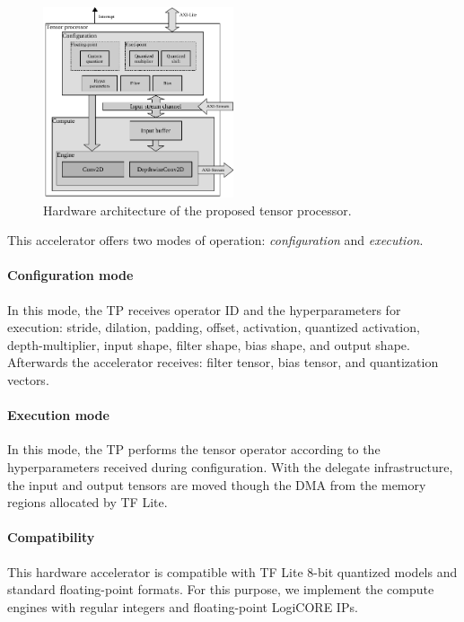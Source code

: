 \begin{figure}[t!]
	\centering
	\includegraphics[width=0.5\textwidth]{../figures/accelerator.pdf}
	\caption{Hardware architecture of the proposed tensor processor.}
	\label{fig:accelerator}
\end{figure}

This accelerator offers two modes of operation: \emph{configuration} and \emph{execution}.

\paragraph{Configuration mode}
In this mode, the TP receives operator ID and the hyperparameters for execution: stride, dilation, padding, offset, activation, quantized activation, depth-multiplier, input shape, filter shape, bias shape, and output shape. Afterwards the accelerator receives: filter tensor, bias tensor, and quantization vectors.

\paragraph{Execution mode}
In this mode, the TP performs the tensor operator according to the hyperparameters received during configuration. With the delegate infrastructure, the input and output tensors are moved though the DMA from the memory regions allocated by TF Lite.

\paragraph{Compatibility}

 This hardware accelerator is compatible with TF Lite 8-bit quantized models and standard floating-point formats. For this purpose, we implement the compute engines with regular integers and floating-point LogiCORE IPs.
 
